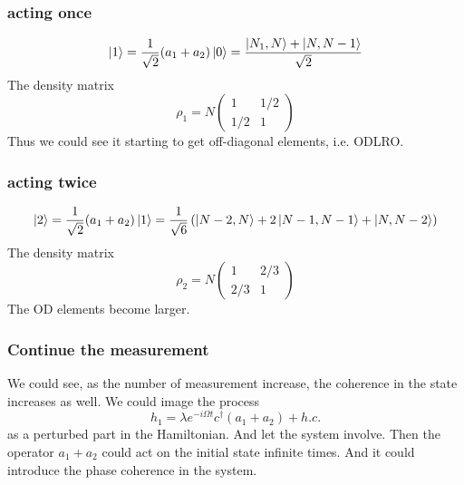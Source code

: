 \subsubsection{acting once}
\begin{equation}
\ket 1 =\frac{1}{\sqrt{2} } (a_1+ a_2)\ket{0} = \frac{\ket{N_1,N}+\ket{N,N-1}}{\sqrt{2}}
\end{equation}
The density matrix
\begin{equation}
\rho_1=N\left( \begin{array}{cc}
1 & 1/2\\
1/2 & 1
\end{array} \right)
\end{equation}
Thus we could see it starting to get off-diagonal elements, i.e. ODLRO.

\subsubsection{acting twice}
\begin{equation}
\ket 2 =  \frac{1}{\sqrt{2} }(a_1+ a_2)\ket{1} = \frac{1}{\sqrt{6}} \left(\ket{N-2, N} + 2\ket{N-1,N-1}+\ket{N,N-2}\right) 
\end{equation}
The density matrix
\begin{equation}
\rho_2 = N\left(\begin{array}{cc}
1 & 2/3\\
2/3 & 1
\end{array}\right)
\end{equation}
The OD elements become larger.

\subsubsection{Continue the measurement}
We could see, as the number of measurement increase, the coherence in the state increases as well.
We could image the process
\begin{equation}
h_1 = \lambda e^{-i\Omega t} c^\dag (a_1+a_2)+h.c.
\end{equation}
as a perturbed part in the Hamiltonian. And let the system involve. 
Then the operator $a_1 + a_2$ could act on the initial state infinite times.
And it could introduce the phase coherence in the system.

